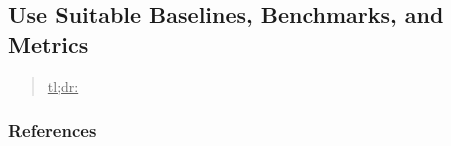 



\subsection{Use Suitable Baselines, Benchmarks, and Metrics}
\label{sec:use-suitable-baselines-benchmarks-and-metrics}

\begin{quote}
\underline{tl;dr:} 
\end{quote}



\subsubsection{References}





